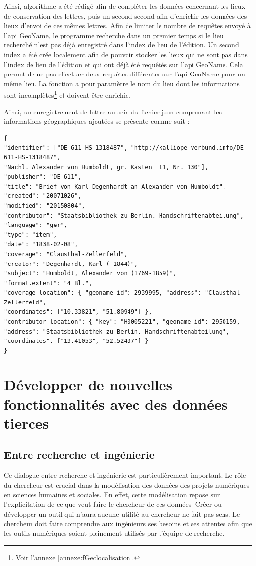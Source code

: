\documentclass[a4paper, 12pt, twoside]{book}
\begin{document}
Ainsi, algorithme a été rédigé afin de compléter les données concernant les lieux de conservation des lettres, puis un second second afin d'enrichir les données des lieux d'envoi de ces mêmes lettres. Afin de limiter le nombre de requêtes envoyé à l'\gls{api} GeoName, le programme recherche dans un premier temps si le lieu recherché n'est pas déjà enregistré dans l'index de lieu de l'édition. Un second index a été crée localement afin de pouvoir stocker les lieux qui ne sont pas dans l'index de lieu de l'édition et qui ont déjà été requêtés sur l'\gls{api} GeoName. Cela permet de ne pas effectuer deux requêtes différentes sur l'\gls{api} GeoName pour un même lieu. La fonction a pour paramètre le nom du lieu dont les informations sont incomplètes\footnote{Voir l'annexe \ref{annexe:fGeolocalisation}.} et doivent être enrichie. 

Ainsi, un enregistrement de lettre au sein du fichier \gls{json} comprenant les informations géographiques ajoutées se présente comme suit :
\newpage
\vspace{-10pt}
\begin{verbatim}
{ 
"identifier": ["DE-611-HS-1318487", "http://kalliope-verbund.info/DE-611-HS-1318487", 
"Nachl. Alexander von Humboldt, gr. Kasten  11, Nr. 130"], 
"publisher": "DE-611", 
"title": "Brief von Karl Degenhardt an Alexander von Humboldt", 
"created": "20071026", 
"modified": "20150804", 
"contributor": "Staatsbibliothek zu Berlin. Handschriftenabteilung", 
"language": "ger", 
"type": "item", 
"date": "1838-02-08", 
"coverage": "Clausthal-Zellerfeld", 
"creator": "Degenhardt, Karl (-1844)", 
"subject": "Humboldt, Alexander von (1769-1859)", 
"format.extent": "4 Bl.", 
"coverage_location": { "geoname_id": 2939995, "address": "Clausthal-Zellerfeld", 
"coordinates": ["10.33821", "51.80949"] }, 
"contributor_location": { "key": "H0005221", "geoname_id": 2950159, 
"address": "Staatsbibliothek zu Berlin. Handschriftenabteilung", 
"coordinates": ["13.41053", "52.52437"] } 
}
\end{verbatim}


\part{Développer de nouvelles fonctionnalités avec des données tierces}
\chapter{Entre recherche et ingénierie}
Ce dialogue entre recherche et ingénierie est particulièrement important. Le rôle du chercheur est crucial dans la modélisation des données des projets numériques en sciences humaines et sociales. En effet, cette modélisation repose sur l'explicitation de ce que veut faire le chercheur de ces données. Créer ou développer un outil qui n'aura aucune utilité au chercheur ne fait pas sens. Le chercheur doit faire comprendre aux ingénieurs ses besoins et ses attentes afin que les outils numériques soient pleinement utilisés par l'équipe de recherche. 
\end{document}
